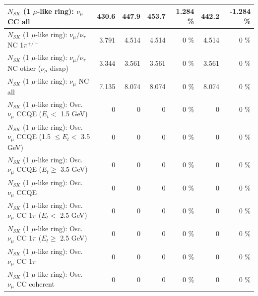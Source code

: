 \begin{table}
\begin{tabular}{| l | r | r | r  r | r  r |}
                                $N_{SK}$ (1 $\mu$-like ring): $\nu_{\mu}$ CC all &           430.6 &           447.9 &           453.7 &    1.284 \%  &           442.2 &   -1.284 \%  \\ 
\hline
              $N_{SK}$ (1 $\mu$-like ring): $\nu_\mu$/$\nu_\tau$ NC 1$\pi^{+/-}$ &           3.791 &           4.514 &           4.514 &        0 \%  &           4.514 &        0 \%  \\ 
   $N_{SK}$ (1 $\mu$-like ring): $\nu_\mu$/$\nu_\tau$ NC other ($\nu_\mu$ disap) &           3.344 &           3.561 &           3.561 &        0 \%  &           3.561 &        0 \%  \\ 
                                $N_{SK}$ (1 $\mu$-like ring): $\nu_{\mu}$ NC all &           7.135 &           8.074 &           8.074 &        0 \%  &           8.074 &        0 \%  \\ 
\hline
\hline
           $N_{SK}$ (1 $\mu$-like ring): Osc. $\nu_\mu$ CCQE ($E_{t} <$ 1.5 GeV) &               0 &               0 &               0 &        0 \%  &               0 &        0 \%  \\ 
  $N_{SK}$ (1 $\mu$-like ring): Osc. $\nu_\mu$ CCQE (1.5 $\leq E_{t} <$ 3.5 GeV) &               0 &               0 &               0 &        0 \%  &               0 &        0 \%  \\ 
        $N_{SK}$ (1 $\mu$-like ring): Osc. $\nu_\mu$ CCQE ($E_{t} \geq$ 3.5 GeV) &               0 &               0 &               0 &        0 \%  &               0 &        0 \%  \\ 
\hline
                               $N_{SK}$ (1 $\mu$-like ring): Osc. $\nu_\mu$ CCQE &               0 &               0 &               0 &        0 \%  &               0 &        0 \%  \\ 
\hline
      $N_{SK}$ (1 $\mu$-like ring): Osc. $\nu_\mu$ CC 1$\pi$ ($E_{t} <$ 2.5 GeV) &               0 &               0 &               0 &        0 \%  &               0 &        0 \%  \\ 
   $N_{SK}$ (1 $\mu$-like ring): Osc. $\nu_\mu$ CC 1$\pi$ ($E_{t} \geq$ 2.5 GeV) &               0 &               0 &               0 &        0 \%  &               0 &        0 \%  \\ 
\hline
                          $N_{SK}$ (1 $\mu$-like ring): Osc. $\nu_\mu$ CC 1$\pi$ &               0 &               0 &               0 &        0 \%  &               0 &        0 \%  \\ 
                        $N_{SK}$ (1 $\mu$-like ring): Osc. $\nu_\mu$ CC coherent &               0 &               0 &               0 &        0 \%  &               0 &        0 \%  \\ 

\end{tabular}
\end{table}
